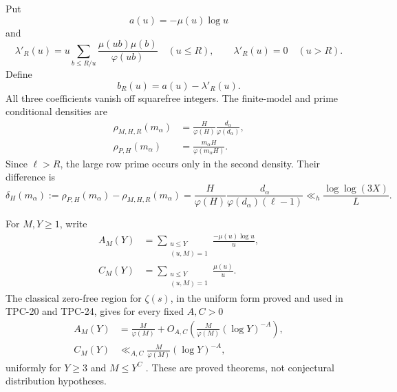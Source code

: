 Put
\begin{equation}
 a(u)=-\mu(u)\log u
 \label{eq:tpc27-a}
\end{equation}
and
\begin{equation}
 \lambda'_R(u)
 =u\sum_{b\le R/u}
 \frac{\mu(ub)\mu(b)}{\varphi(ub)}
 \quad(u\le R),
 \qquad \lambda'_R(u)=0\quad(u>R).
 \label{eq:tpc27-lambda-prime}
\end{equation}
Define
\begin{equation}
 b_R(u)=a(u)-\lambda'_R(u).
 \label{eq:tpc27-bR}
\end{equation}
All three coefficients vanish off squarefree integers.  The finite-model
and prime conditional densities are
\begin{align}
 \rho_{M,H,R}(m_\alpha)
 &=\frac H{\varphi(H)}
   \frac{d_\alpha}{\varphi(d_\alpha)},
 \label{eq:tpc27-model-density}\\
 \rho_{P,H}(m_\alpha)
 &=\frac{m_\alpha H}{\varphi(m_\alpha H)}.
 \label{eq:tpc27-prime-density}
\end{align}
Since \(\ell>R\), the large row prime occurs only in the second
density.  Their difference is
\begin{equation}
 \delta_H(m_\alpha)
 :=\rho_{P,H}(m_\alpha)-\rho_{M,H,R}(m_\alpha)
 =\frac H{\varphi(H)}
  \frac{d_\alpha}{\varphi(d_\alpha)(\ell-1)}
 \ll_h\frac{\log\log(3X)}{L}.
 \label{eq:tpc27-row-drift}
\end{equation}

For \(M,Y\ge1\), write
\begin{align}
 A_M(Y)&=
 \sum_{\substack{u\le Y\\(u,M)=1}}
 \frac{-\mu(u)\log u}{u},
 \label{eq:tpc27-AM}\\
 C_M(Y)&=
 \sum_{\substack{u\le Y\\(u,M)=1}}
 \frac{\mu(u)}u.
 \label{eq:tpc27-CM}
\end{align}
The classical zero-free region for \(\zeta(s)\), in the uniform form
proved and used in TPC-20 and TPC-24, gives for every fixed \(A,C>0\)
\begin{align}
 A_M(Y)&=\frac M{\varphi(M)}
 +O_{A,C}\!\left(
  \frac M{\varphi(M)}(\log Y)^{-A}\right),
 \label{eq:tpc27-uniform-A}\\
 C_M(Y)&\ll_{A,C}
 \frac M{\varphi(M)}(\log Y)^{-A},
 \label{eq:tpc27-uniform-C}
\end{align}
uniformly for \(Y\ge3\) and \(M\le Y^C\)
\citep{IwaniecKowalski2004,WangTPC20,WangTPC24}.  These are proved
theorems, not conjectural distribution hypotheses.

